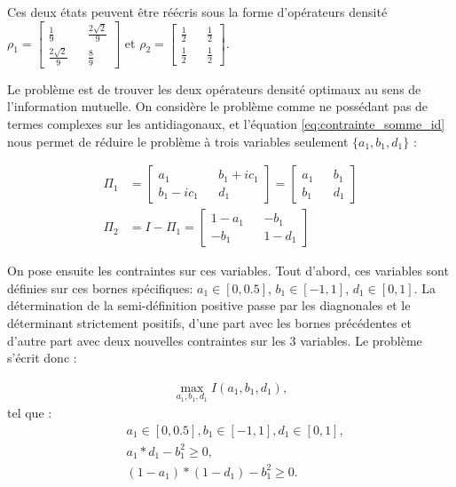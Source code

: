 \documentclass[12pt,a4paper]{article}
\begin{document}
    Ces deux états peuvent être réécris sous la forme d'opérateurs densité $\rho_1 = \begin{bmatrix}\frac{1}{9} && \frac{2 \sqrt{2}}{9} \\ \frac{2 \sqrt{2}}{9} && \frac{8}{9} \end{bmatrix}$ et $\rho_2 = \begin{bmatrix}\frac{1}{2} && \frac{1}{2} \\ \frac{1}{2} && \frac{1}{2} \end{bmatrix}$.

    Le problème est de trouver les deux opérateurs densité optimaux au sens de l'information mutuelle. On considère le problème comme ne possédant pas de termes complexes sur les antidiagonaux, et l'équation \ref{eq:contrainte_somme_id} nous permet de réduire le problème à trois variables seulement $\{a_1, b_1, d_1\}$ :

    \begin{align}
        \Pi_1 &= \begin{bmatrix}a_1 && b_1 + ic_1 \\ b_1 - ic_1 && d_1\end{bmatrix} = \begin{bmatrix}a_1 && b_1 \\ b_1 && d_1\end{bmatrix} \\
        \Pi_2 &= I - \Pi_1 = \begin{bmatrix}1 - a_1 && -b_1 \\ -b_1 && 1 - d_1\end{bmatrix}
    \end{align}

    On pose ensuite les contraintes sur ces variables. Tout d'abord, ces variables sont définies sur ces bornes spécifiques: $a_1 \in [0, 0.5]$, $b_1 \in [-1, 1]$, $d_1 \in [0, 1]$. La détermination de la semi-définition positive passe par les diagnonales et le déterminant strictement positifs, d'une part avec les bornes précédentes et d'autre part avec deux nouvelles contraintes sur les 3 variables.
    Le problème s'écrit donc :

    \begin{align}
        \max\limits_{a_1, b_1, d_1} I(a_1, b_1, d_1) , \nonumber
    \end{align}
    tel que :
    \begin{align}
        &a_1 \in [0, 0.5] , b_1 \in [-1, 1] , d_1 \in [0, 1] , \nonumber \\
        &a_1 * d_1 - b_1^2 \geq 0 , \nonumber \\
        &(1-a_1) * (1-d_1) - b_1^2 \geq 0. \nonumber
    \end{align}
\end{document}
